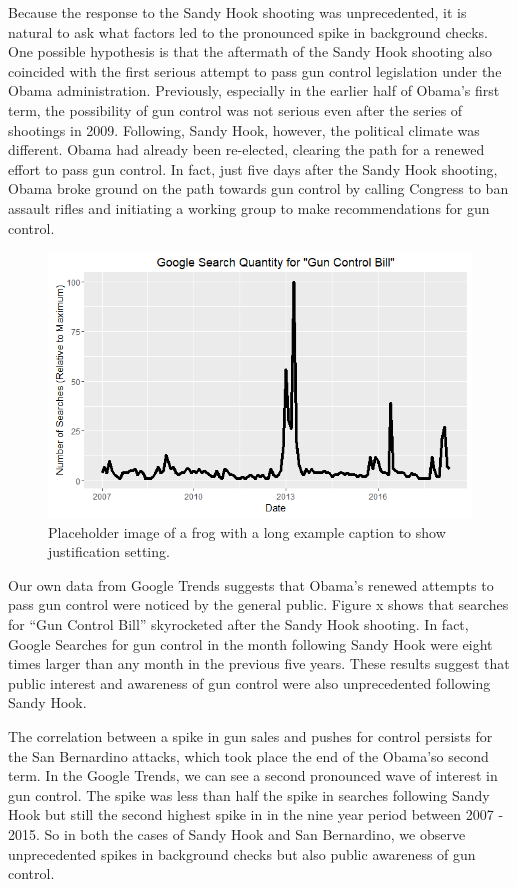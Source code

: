 \documentclass[9pt,twocolumn,twoside,lineno]{pnas-new}
\begin{document}
Because the response to the Sandy Hook shooting was unprecedented, it is natural to ask what factors led to the pronounced spike in background checks. One possible hypothesis is that the aftermath of the Sandy Hook shooting also coincided with the first serious attempt to pass gun control legislation under the Obama administration. Previously, especially in the earlier half of Obama’s first term, the possibility of gun control was not serious even after the series of shootings in 2009. Following, Sandy Hook, however, the political climate was different. Obama had already been re-elected, clearing the path for a renewed effort to pass gun control. In fact, just five days after the Sandy Hook shooting, Obama broke ground on the path towards gun control by calling Congress to ban assault rifles and initiating a working group to make recommendations for gun control. 
\begin{figure}
  \centering
  \includegraphics[width=\linewidth]{figures/google-trends-gun-control}
  \caption{Placeholder image of a frog with a long example caption to show justification setting.}
  \label{fig:gtrends}
\end{figure}
	Our own data from Google Trends suggests that Obama’s renewed attempts to pass gun control were noticed by the general public. Figure x shows that searches for “Gun Control Bill” skyrocketed after the Sandy Hook shooting. In fact, Google Searches for gun control in the month following Sandy Hook were eight times larger than any month in the previous five years. These results suggest that public interest and awareness of gun control were also unprecedented following Sandy Hook. 
    
	The correlation between a spike in gun sales and pushes for control persists for the San Bernardino attacks, which took place the end of the Obama’so second term. In the Google Trends, we can see a second pronounced wave of interest in gun control. The spike was less than half the spike in searches following Sandy Hook but still the second highest spike in in the nine year period between 2007 - 2015. So in both the cases of Sandy Hook and San Bernardino, we observe unprecedented spikes in background checks but also public awareness of gun control. 
\end{document}
